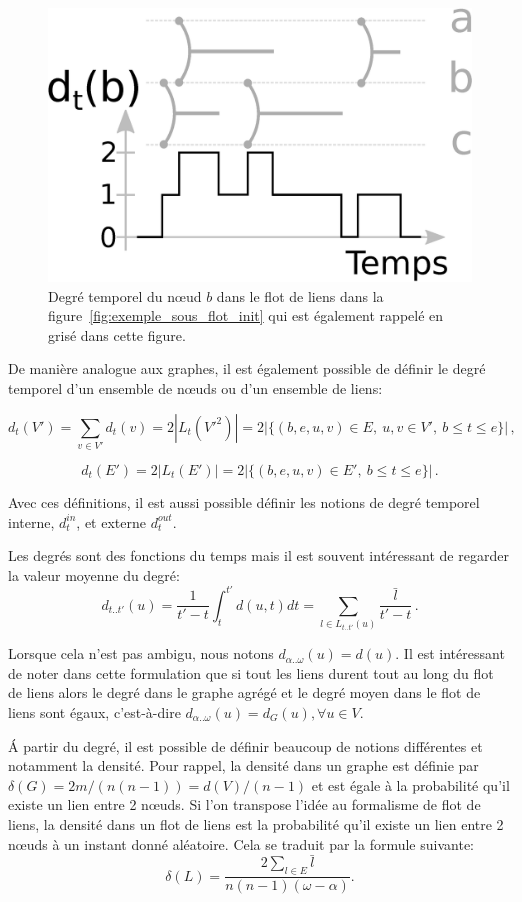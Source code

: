 \begin{figure}
\centering
\includegraphics[width=0.5\linewidth]{img/Intro/degre2.eps}
\caption{Degré temporel du n\oe ud $b$ dans le flot de liens dans la figure~\ref{fig:exemple_sous_flot_init} qui est également rappelé en grisé dans cette figure.
}
\label{fig:exemple_degre}
\end{figure}

De manière analogue aux graphes, il est également possible de définir le degré temporel d'un ensemble de n\oe uds ou d'un ensemble de liens:

\begin{equation}
d_t(V')= \sum_{v \in V'} d_t(v) = 2 |L_{t}(V'^2)| = 2|\{(b,e,u,v) \in E,\ u,v \in V',\ b \leq t \leq e\}|\,,
\end{equation}

\begin{equation}
d_t(E')=2|L_{t}(E')|= 2|\{(b,e,u,v) \in E',\ b \leq t \leq e\}|\,.
\end{equation}

Avec ces définitions, il est aussi possible définir les notions de degré temporel interne, $d_t^{in}$, et externe $d_t^{out}$.
\bigskip

Les degrés sont des fonctions du temps mais il est souvent intéressant de regarder la valeur moyenne du degré:
\begin{equation}
d_{t..t'}(u)=\dfrac{1}{t'-t}  \int_{t}^{t'}d(u,t) dt = \sum_{l \in L_{t..t'}(u)} \dfrac{\bar{l}}{t'-t} \, .
\label{eq:deg_moyen}
\end{equation}

Lorsque cela n'est pas ambigu, nous notons $d_{\alpha..\omega}(u) = d(u)$.
Il est intéressant de noter dans cette formulation que si tout les liens durent tout au long du flot de liens alors le degré dans le graphe agrégé et le degré moyen dans le flot de liens sont égaux, c'est-à-dire  $d_{\alpha..\omega}(u) = d_G(u), \forall u \in V$.

\'A partir du degré, il est possible de définir beaucoup de notions différentes et notamment la densité.
Pour rappel, la densité dans un graphe est définie par $\delta(G)=2m/(n(n-1))=d(V)/(n-1)$ et est égale à la probabilité qu'il existe un lien entre 2 n\oe uds.
Si l'on transpose l'idée au formalisme de flot de liens, la densité dans un flot de liens est la probabilité qu'il existe un lien entre 2 n\oe uds à un instant donné aléatoire.
Cela se traduit par la formule suivante:
\begin{equation}
\delta(L)= \dfrac{2 \sum_{l \in E}\bar{l}}{n(n-1) (\omega-\alpha)}.
\end{equation}

